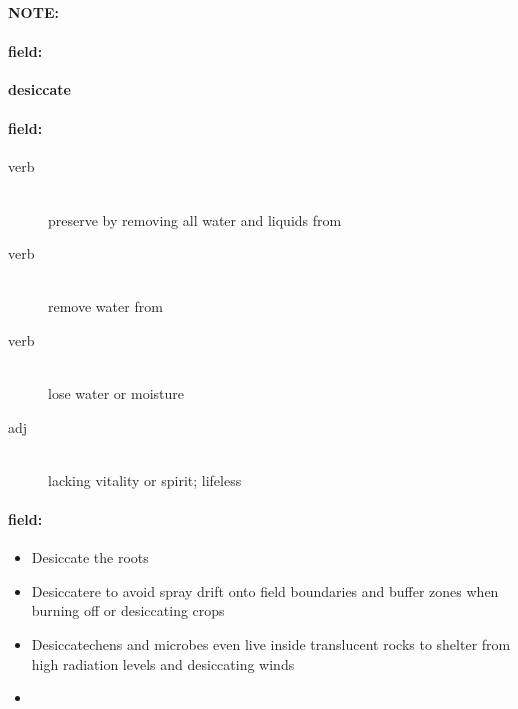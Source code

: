 \documentclass[12pt]{article}
\newenvironment{note}{\paragraph{NOTE:}}{}
\newenvironment{field}{\paragraph{field:}}{}
\begin{document}
\begin{note}
\begin{field}
\textbf{\large desiccate}
\end{field}


\begin{field}
\begin{description}
\item[verb] \hfill \\ 
preserve by removing all water and liquids from

\item[verb] \hfill \\ 
remove water from

\item[verb] \hfill \\ 
lose water or moisture

\item[adj] \hfill \\ 
lacking vitality or spirit; lifeless

\end{description}
\end{field}

\begin{field}
\begin{itemize}
\item Desiccate the roots
\item Desiccatere to avoid spray drift onto field boundaries and buffer zones when burning off or desiccating crops
\item Desiccatechens and microbes even live inside translucent rocks to shelter from high radiation levels and desiccating winds
\item 
\end{itemize}
\end{field}
\end{note}
\end{document}
